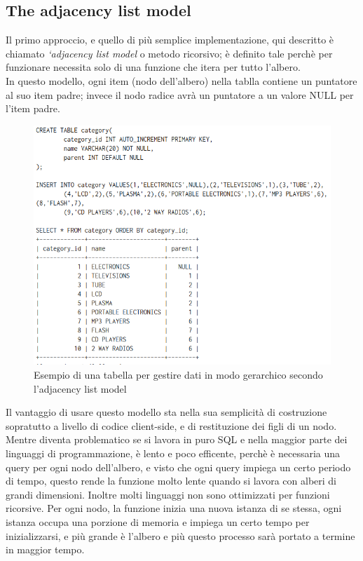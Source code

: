 \subsection{The adjacency list model}
Il primo approccio, e quello di più semplice implementazione, qui descritto è chiamato \textit{‘adjacency list model} o metodo ricorsivo;
è definito tale perchè per funzionare necessita solo di una funzione che itera per tutto l'albero.\\
In questo modello, ogni item (nodo dell'albero) nella tablla contiene un puntatore al suo item padre; invece il nodo radice avrà un puntatore a un valore
NULL per l'item padre.

\begin{figure}[ht!]
    \centering
	\includegraphics[scale=0.75]{images/Adjacency_list_model_table.PNG}
	\caption{Esempio di una tabella per gestire dati in modo gerarchico secondo l'adjacency list model }
\end{figure}
 
Il vantaggio di usare questo modello sta nella sua semplicità di costruzione sopratutto a livello di codice client-side, 
e di restituzione dei figli di un nodo. Mentre diventa problematico se si lavora in puro SQL e nella maggior parte dei linguaggi di 
programmazione, è lento e poco efficente, perchè è necessaria una query per ogni nodo dell'albero, e visto che ogni query impiega 
un certo periodo di tempo, questo rende la funzione molto lente quando si lavora con alberi di grandi dimensioni.
Inoltre molti linguaggi non sono ottimizzati per funzioni ricorsive. Per ogni nodo, la funzione inizia una nuova istanza di se stessa,
ogni istanza occupa una porzione di memoria e impiega un certo tempo per inizializzarsi, e più grande è l'albero e più questo 
processo sarà portato a termine in maggior tempo.

